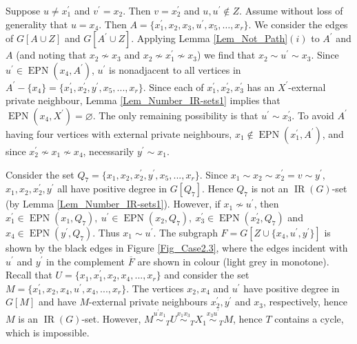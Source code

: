 \documentclass[12pt]{article}%
\begin{document}
Suppose $u\neq x_{1}^{\prime}$ and $v^{\prime}=x_{2}$. Then $v=x_{2}^{\prime}$
and $u,u^{\prime}\notin Z$. Assume without loss of generality that $u=x_{4}$.
Then $A=\{x_{1}^{\prime},x_{2},x_{3},u^{\prime},x_{5},\dots,x_{r}\}$. We
consider the edges of $G[A\cup Z]$ and $G[A^{\prime}\cup Z]$. Applying Lemma
\ref{Lem_Not_Path}$(i)$ to $A^{\prime}$ and $A$ (and noting that $x_{2}\nsim
x_{3}$ and $x_{2}\nsim x_{1}^{\prime}\nsim x_{3}$) we find that $x_{2}\sim
u^{\prime}\sim x_{3}$.\emph{ }Since $u^{\prime}\in\operatorname{EPN}%
(x_{4},A^{\prime})$, $u^{\prime}$ is nonadjacent to all vertices in
$A^{\prime}-\{x_{4}\}=\{x_{1}^{\prime},x_{2}^{\prime},y^{\prime}%
,x_{5},...,x_{r}\}$. Since each of $x_{1}^{\prime},x_{2}^{\prime}%
,x_{3}^{\prime}$ has an $X^{\prime}$-external private neighbour, Lemma
\ref{Lem_Number_IR-sets1} implies that $\operatorname{EPN}(x_{4},X^{\prime
})=\varnothing$. The only remaining possibility is that $u^{\prime}\sim
x_{3}^{\prime}$. To avoid $A^{\prime}$ having four vertices with external
private neighbours, $x_{1}\notin\operatorname{EPN}(x_{1}^{\prime},A^{\prime}%
)$, and since $x_{2}^{\prime}\nsim x_{1}\nsim x_{4}$, necessarily $y^{\prime
}\sim x_{1}$.

Consider the set $Q_{7}=\{x_{1},x_{2},x_{2}^{\prime},y^{\prime},x_{5}%
,...,x_{r}\}$. Since $x_{1}\sim x_{2}\sim x_{2}^{\prime}=v\sim y^{\prime}$,
$x_{1},x_{2},x_{2}^{\prime},y^{\prime}$ all have positive degree in $G[Q_{7}%
]$. Hence $Q_{7}$ is not an $\operatorname{IR}(G)$-set (by Lemma
\ref{Lem_Number_IR-sets1}). However, if $x_{1}\nsim u^{\prime}$, then
$x_{1}^{\prime}\in\operatorname{EPN}(x_{1},Q_{7}),\ u^{\prime}\in
\operatorname{EPN}(x_{2},Q_{7}),\ x_{3}^{\prime}\in\operatorname{EPN}%
(x_{2}^{\prime},Q_{7})$ and $x_{4}\in\operatorname{EPN}(y^{\prime},Q_{7})$.
Thus $x_{1}\sim u^{\prime}$. The subgraph $F=G[Z\cup\{x_{4},u^{\prime
},y^{\prime}\}]$ is shown by the black edges in Figure \ref{Fig_Case2.3},
where the edges incident with $u^{\prime}$ and $y^{\prime}$ in the complement
$\overline{F}$ are shown in colour (light grey in monotone). Recall that
$U=\{x_{1},x_{1}^{\prime},x_{2},x_{4},...,x_{r}\}$ and consider the set
$M=\{x_{1}^{\prime},x_{2},x_{4},u^{\prime},x_{4},...,x_{r}\}$. The vertices
$x_{2},x_{4}$ and $u^{\prime}$ have positive degree in $G[M]$ and have
$M$-external private neighbours $x_{2}^{\prime},y^{\prime}$ and $x_{3}$,
respectively, hence $M$ is an $\operatorname{IR}(G)$-set. However,
$M\overset{u^{\prime}x_{1}}{\sim}_{T}U\overset{x_{1}x_{3}}{\sim}_{T}%
X_{1}\overset{x_{3}u^{\prime}}{\sim}_{T}M$, hence $T$ contains a cycle, which
is impossible.%
\end{document}
